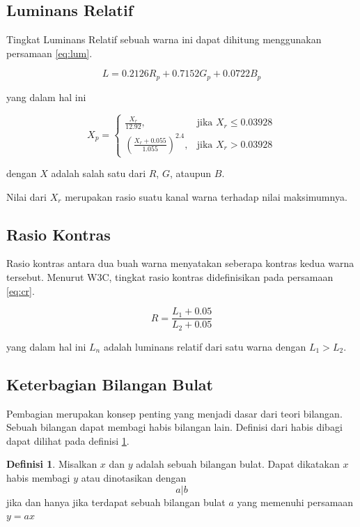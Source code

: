 \documentclass[10pt,conference]{IEEEtran}
\theoremstyle{definition}
\newtheorem{definition}{Definisi}[section]
\begin{document}
\subsection{Luminans Relatif}
Tingkat Luminans Relatif sebuah warna ini dapat dihitung menggunakan persamaan \ref{eq:lum}.\cite{w1}

\begin{equation} \label{eq:lum}
    L = 0.2126 R_p + 0.7152 G_p + 0.0722 B_p
\end{equation}

yang dalam hal ini

$$ 
X_p = \begin{cases}
    \frac{X_r}{12.92}, &\text{jika } X_r \le 0.03928 \\
    (\frac{X_r+0.055}{1.055}) ^ {2.4},  &\text{jika } X_r > 0.03928 
\end{cases} 
$$

dengan $X$ adalah salah satu dari $R$, $G$, ataupun $B$.

Nilai dari $X_r$ merupakan rasio suatu kanal warna terhadap nilai maksimumnya.

\subsection{Rasio Kontras}
Rasio kontras antara dua buah warna menyatakan seberapa kontras kedua warna tersebut. Menurut W3C, tingkat
rasio kontras didefinisikan pada persamaan \ref{eq:cr}.\cite{w1}

\begin{equation} \label{eq:cr}
    R = \frac{L_1 + 0.05}{L_2 + 0.05}
\end{equation}

yang dalam hal ini $L_n$ adalah luminans relatif dari satu warna dengan $ L_1 > L_2 $.


\subsection{Keterbagian Bilangan Bulat}
Pembagian merupakan konsep penting yang menjadi dasar dari teori bilangan. Sebuah bilangan dapat membagi habis bilangan lain. Definisi dari habis dibagi dapat dilihat pada
definisi \ref{def:divided}.

\begin{definition} \label{def:divided}
    Misalkan $x$ dan $y$ adalah sebuah bilangan bulat. Dapat dikatakan $x$ habis membagi $y$ atau dinotasikan dengan
    $$ a | b $$
    jika dan hanya jika terdapat sebuah bilangan bulat $a$ yang memenuhi persamaan $ y = ax $
\end{definition}
\end{document}
